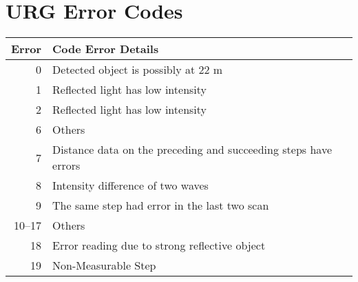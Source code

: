 \chapter{URG Error Codes}
\label{app:urg-error}
\begin{table*}[htbp]
    \centering
    \begin{tabular}{|r|l|}
        \hline
        Error &  Code Error Details \\
        \hline
        0     & Detected object is possibly at 22 m \\
        1     & Reflected light has low intensity \\
        2     & Reflected light has low intensity \\
        6     & Others \\
        7     & Distance data on the preceding and succeeding steps have errors\\
        8     & Intensity difference of two waves\\
        9     & The same step had error in the last two scan\\
        10--17& Others\\
        18    & Error reading due to strong reflective object\\
        19    & Non-Measurable Step \\
        \hline
    \end{tabular}
\end{table*}

